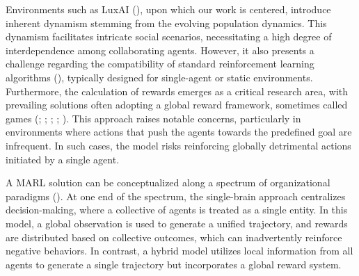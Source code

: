 \bigskip

\noindent Environments such as LuxAI (\textcolor{deepblue}{\cite{lux-ai-season-2}}), upon which our work is centered, introduce inherent dynamism stemming from the evolving population dynamics. This dynamism facilitates intricate social scenarios, necessitating a high degree of interdependence among collaborating agents. However, it also presents a challenge regarding the compatibility of standard reinforcement learning algorithms (\textcolor{deepblue}{\cite{wong2022deep}}), typically designed for single-agent or static environments. Furthermore, the calculation of rewards emerges as a critical research area, with prevailing solutions often adopting a global reward framework, sometimes called \textcolor{deepblue}{} games (\textcolor{deepblue}{\cite{chen2023emergent}; \cite{agapiou2023melting}; \cite{ye2023global}; \cite{leroy2020qvmix}; \cite{suarez2019neural}}). This approach raises notable concerns, particularly in environments where actions that push the agents towards the predefined goal are infrequent. In such cases, the model risks reinforcing globally detrimental actions initiated by a single agent.

\bigskip

\noindent A MARL solution can be conceptualized along a spectrum of organizational paradigms (\textcolor{deepblue}{\cite{piccoli2023control}}). At one end of the spectrum, the single-brain approach centralizes decision-making, where a collective of agents is treated as a single entity. In this model, a global observation is used to generate a unified trajectory, and rewards are distributed based on collective outcomes, which can inadvertently reinforce negative behaviors. In contrast, a hybrid model utilizes local information from all agents to generate a single trajectory but incorporates a global reward system. 

\bigskip

